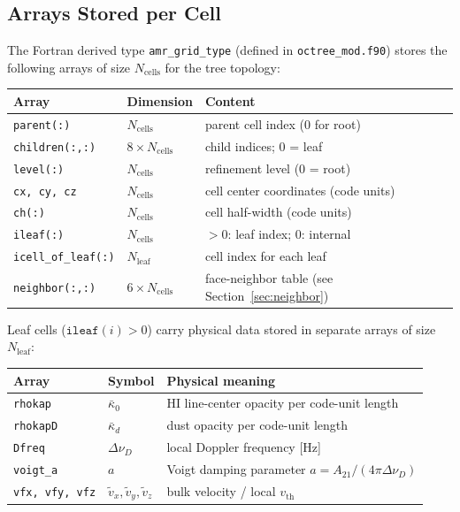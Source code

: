 \documentclass[english,a4paper]{my_memo}
\begin{document}
\subsection{Arrays Stored per Cell}

The Fortran derived type \texttt{amr\_grid\_type} (defined in
\texttt{octree\_mod.f90}) stores the following arrays of size $N_\mathrm{cells}$
for the tree topology:

\begin{center}
\begin{tabular}{lll}
\hline
Array & Dimension & Content \\
\hline
\texttt{parent(:)}      & $N_\mathrm{cells}$        & parent cell index (0 for root) \\
\texttt{children(:,:)}  & $8 \times N_\mathrm{cells}$ & child indices; 0 = leaf \\
\texttt{level(:)}       & $N_\mathrm{cells}$        & refinement level (0 = root) \\
\texttt{cx, cy, cz}     & $N_\mathrm{cells}$        & cell center coordinates (code units) \\
\texttt{ch(:)}          & $N_\mathrm{cells}$        & cell half-width (code units) \\
\texttt{ileaf(:)}       & $N_\mathrm{cells}$        & $> 0$: leaf index; 0: internal \\
\texttt{icell\_of\_leaf(:)} & $N_\mathrm{leaf}$     & cell index for each leaf \\
\texttt{neighbor(:,:)}  & $6 \times N_\mathrm{cells}$ & face-neighbor table (see Section~\ref{sec:neighbor}) \\
\hline
\end{tabular}
\end{center}

Leaf cells ($\texttt{ileaf}(i) > 0$) carry physical data stored in separate
arrays of size $N_\mathrm{leaf}$:

\begin{center}
\begin{tabular}{lll}
\hline
Array & Symbol & Physical meaning \\
\hline
\texttt{rhokap}  & $\bar\kappa_0$ & HI line-center opacity per code-unit length \\
\texttt{rhokapD} & $\bar\kappa_d$ & dust opacity per code-unit length \\
\texttt{Dfreq}   & $\Delta\nu_D$ & local Doppler frequency [Hz] \\
\texttt{voigt\_a}& $a$           & Voigt damping parameter $a = A_{21}/(4\pi\Delta\nu_D)$ \\
\texttt{vfx, vfy, vfz} & $\tilde{v}_x,\tilde{v}_y,\tilde{v}_z$ & bulk velocity / local $v_\mathrm{th}$ \\
\hline
\end{tabular}
\end{center}
\end{document}
